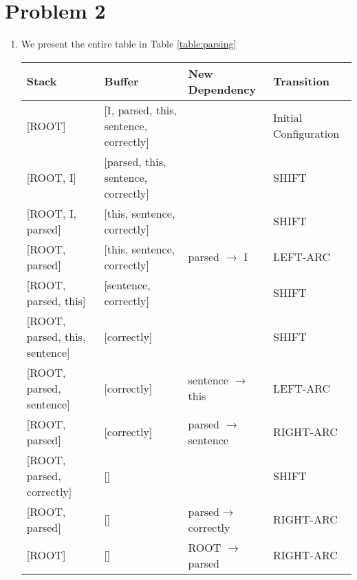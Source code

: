 \documentclass[12pt]{article}
\begin{document}
\section*{Problem 2}
\begin{enumerate}[label=(\alph*)]
  \item We present the entire table in Table \ref{table:parsing}
    \begin{table}[h!]
      \centering
      \begin{tabular}{l|l|l|l}
      Stack                              & Buffer                                     & New Dependency                & Transition            \\ \hline
      {[}ROOT{]}                         & {[}I, parsed, this, sentence, correctly{]} &                               & Initial Configuration \\
      {[}ROOT, I{]}                      & {[}parsed, this, sentence, correctly{]}    &                               & SHIFT                 \\
      {[}ROOT, I, parsed{]}              & {[}this, sentence, correctly{]}            &                               & SHIFT                 \\
      {[}ROOT, parsed{]}                 & {[}this, sentence, correctly{]}            & parsed $\rightarrow$ I        & LEFT-ARC              \\
      {[}ROOT, parsed, this{]}           & {[}sentence, correctly{]}                  &                               & SHIFT                 \\
      {[}ROOT, parsed, this, sentence{]} & {[}correctly{]}                            &                               & SHIFT                 \\
      {[}ROOT, parsed, sentence{]}       & {[}correctly{]}                            & sentence $\rightarrow$ this   & LEFT-ARC              \\
      {[}ROOT, parsed{]}                 & {[}correctly{]}                            & parsed $\rightarrow$ sentence & RIGHT-ARC             \\
      {[}ROOT, parsed, correctly{]}      & {[}{]}                                     &                               & SHIFT                 \\
      {[}ROOT, parsed{]}                 & {[}{]}                                     & parsed$\rightarrow$ correctly & RIGHT-ARC             \\
      {[}ROOT{]}                         & {[}{]}                                     & ROOT $\rightarrow$ parsed     & RIGHT-ARC            

\end{tabular}
\end{table}
\end{enumerate}
\end{document}
